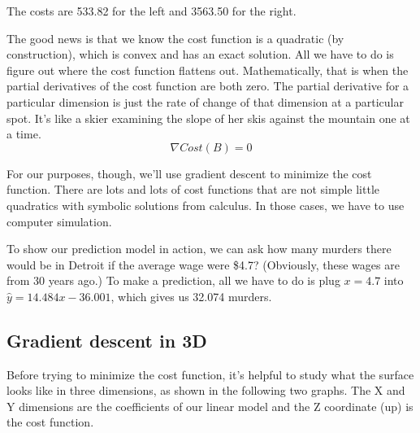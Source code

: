 \documentclass[titlepage]{tufte-book}
\begin{document}
\begin{fullwidth}
\noindent The costs are 533.82 for the left and 3563.50 for the right.

The good news is that we know the cost function is a quadratic (by construction), which is convex and has an exact solution. All we have to do is figure out where the cost function flattens out. Mathematically, that is when the partial derivatives of the cost function are both zero. The partial derivative for a particular dimension is just the rate of change of that dimension at a particular spot. It's like a skier examining the slope of her skis against the mountain one at a time.
\[\tag{Analytic solution to optimization}
\nabla Cost(B) = 0
\]

\noindent For our purposes, though, we'll use gradient descent to minimize the cost function. There are lots and lots of cost functions that are not simple little quadratics with symbolic solutions from calculus. In those cases, we have to use computer simulation.

To show our prediction model in action, we can ask how many murders  there would be in Detroit if the average wage were \$4.7? (Obviously, these wages are from 30 years ago.) To make a prediction, all we have to do is plug $x=4.7$ into $\hat{y} = 14.484 x - 36.001$, which gives us 32.074 murders.

\subsection{Gradient descent in 3D}

Before trying to minimize the cost function, it's helpful to study what the surface looks like in three dimensions, as shown in the following two graphs. The X and Y dimensions are the coefficients of our linear model and the Z coordinate (up) is the cost function.


\end{fullwidth}
\end{document}
